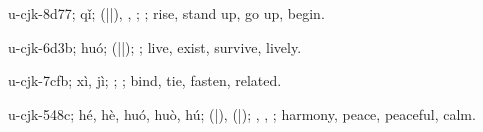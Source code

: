 \begin{multicols}{2}
{\cjkgGlue{}u-cjk-8d77; qǐ; \cjkgGlue{}\cjkgGlue{}(\cjkgGlue{}|\cjkgGlue{}|\cjkgGlue{}), \cjkgGlue{}\cjkgGlue{}\cjkgGlue{}, \cjkgGlue{}\cjkgGlue{}\cjkgGlue{}; \cjkgGlue{}; rise, stand up, go up, begin.

\cjkgGlue{}u-cjk-6d3b; huó; \cjkgGlue{}\cjkgGlue{}(\cjkgGlue{}|\cjkgGlue{}|\cjkgGlue{}); \cjkgGlue{}; live, exist, survive, lively.

\cjkgGlue{}u-cjk-7cfb; xì, jì; \cjkgGlue{}; \cjkgGlue{}; bind, tie, fasten, related.

\cjkgGlue{}u-cjk-548c; hé, hè, huó, huò, hú; \cjkgGlue{}\cjkgGlue{}(\cjkgGlue{}|\cjkgGlue{}), \cjkgGlue{}\cjkgGlue{}(\cjkgGlue{}|\cjkgGlue{}); \cjkgGlue{}, \cjkgGlue{}, \cjkgGlue{}; harmony, peace, peaceful, calm.

}
\end{multicols}
